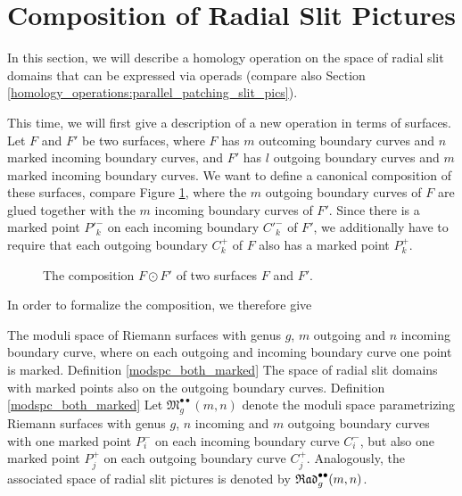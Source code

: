 \section{Composition of Radial Slit Pictures}
\label{radial_composition}

In this section, we will describe a homology operation on the space of radial slit domains 
that can be expressed via operads (compare also Section \ref{homology_operations:parallel_patching_slit_pics}).

This time, we will first give a description of a new operation in terms of surfaces.
Let $F$ and $F'$ be two surfaces, where $F$ has $m$ outcoming boundary curves and $n$ marked incoming boundary curves,
and $F'$ has $l$ outgoing boundary curves and $m$ marked incoming boundary curves.
We want to define a canonical composition of these surfaces, compare Figure \ref{radial_connected_sum_on_surfaces},
where the $m$ outgoing boundary curves of $F$ are glued together with the $m$ incoming boundary curves of $F'$.
Since there is a marked point ${P'}^-_k$ on each incoming boundary ${C'}^-_k$ of $F'$, we additionally have to require that each outgoing boundary ${C}^+_k$ of $F$ also has a marked point ${P}^+_k$.

\begin{figure}[ht]
    \centering
    \def\svgwidth{.8\columnwidth}
    
    \caption{\label{radial_connected_sum_on_surfaces}The composition $F \odot F'$ of two surfaces $F$ and $F'$.}
\end{figure}

In order to formalize the composition, we therefore give

\begin{defi}
\label{modspc_both_marked}
  {The moduli space of Riemann surfaces with genus $g$, $m$ outgoing and $n$ incoming boundary curve, where on each outgoing and incoming boundary curve one point is marked.}
  {Definition \ref{modspc_both_marked}}
  {The space of radial slit domains with marked points also on the outgoing boundary curves.}
  {Definition \ref{modspc_both_marked}}
   Let $\mathfrak{M}^{\bullet \bullet}_{g}(m, n)$ denote the moduli space parametrizing Riemann surfaces with genus $g$, $n$ incoming and $m$ outgoing boundary curves
   with one marked point $P^-_i$ on each incoming boundary curve $C^-_i$, but also one marked point $P^+_j$ on each outgoing boundary curve $C^+_j$. 
   Analogously, the associated space of radial slit pictures is denoted by $\mathfrak{Rad}^{\bullet \bullet}_g(m, n)$.
\end{defi}

